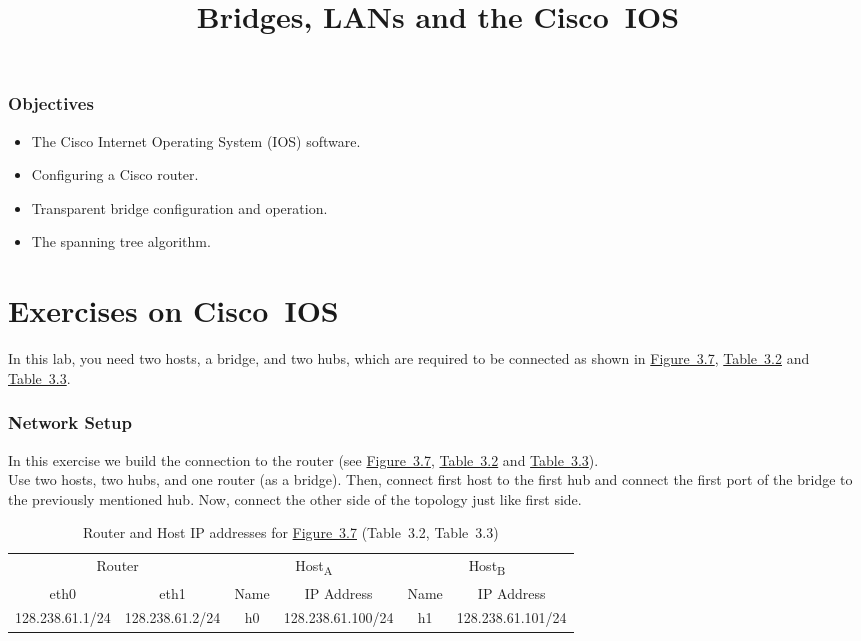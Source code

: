 \documentclass{UTNetLab}
\title{Bridges, LANs and the Cisco~IOS}
\begin{document}
	\section*{Objectives}
	\begin{itemize}
		\item The Cisco Internet Operating System (IOS) software.
		\item Configuring a Cisco router.
		\item Transparent bridge configuration and operation.
		\item The spanning tree algorithm.
	\end{itemize}
	
\part{Exercises on Cisco~IOS}
In this lab, you need two hosts, a bridge, and two hubs, which are required to be connected as shown in \hyperref[fig:3.7]{Figure~3.7}, \hyperref[tab:3.2]{Table~3.2} and \hyperref[tab:3.3]{Table~3.3}.

\section{Network Setup}

In this exercise we build the connection to the router (see  \hyperref[fig:3.7]{Figure~3.7}, \hyperref[tab:3.2]{Table~3.2} and \hyperref[tab:3.3]{Table~3.3}).\\
Use two hosts, two hubs, and one router (as a bridge). Then, connect first host to the first hub and connect
the first port of the bridge to the previously mentioned hub. Now, connect the other side of the topology just
like first side.

\begin{table}[H]
	\caption{Router and Host IP addresses for \hyperref[fig:3.7]{Figure~3.7} (Table~3.2\label{tab:3.2}, Table~3.3\label{tab:3.3})}
	\centering
	\begin{tabular}{ *2c|*2c|*2c }
		\hline \hline
		\multicolumn{2}{c|}{Router} & \multicolumn{2}{c|}{Host\textsubscript{A}} & \multicolumn{2}{c}{Host\textsubscript{B}} \\
		eth0 & eth1 & Name & IP Address & Name & IP Address \\
		\hline 
		128.238.61.1/24 & 128.238.61.2/24 & h0 & 128.238.61.100/24 & h1 & 128.238.61.101/24 \\
		\hline \hline
	\end{tabular}
\end{table}
\end{document}
